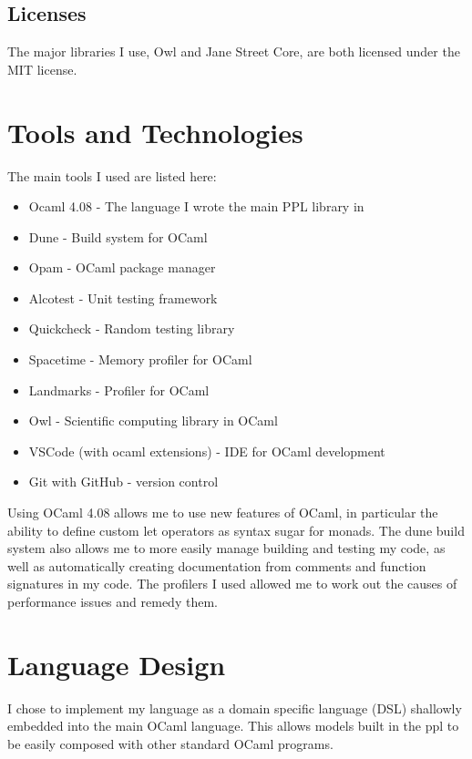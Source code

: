 \subsection{Licenses}

The major libraries I use, Owl and Jane Street Core, are both licensed under the MIT license.

\section{Tools and Technologies}
The main tools I used are listed here:
\begin{itemize}
    \item Ocaml 4.08 - The language I wrote the main PPL library in
    \item Dune - Build system for OCaml
    \item Opam - OCaml package manager
    \item Alcotest - Unit testing framework
    \item Quickcheck - Random testing library
    \item Spacetime - Memory profiler for OCaml
    \item Landmarks - Profiler for OCaml
    \item Owl - Scientific computing library in OCaml
    \item VSCode (with ocaml extensions) - IDE for OCaml development
    \item Git with GitHub - version control
\end{itemize}

Using OCaml 4.08 allows me to use new features of OCaml, in particular the ability to define custom let operators as syntax sugar for monads. The dune build system also allows me to more easily manage building and testing my code, as well as automatically creating documentation from comments and function signatures in my code. The profilers I used allowed me to work out the causes of performance issues and remedy them. 

\section{Language Design}
I chose to implement my language as a domain specific language (DSL) shallowly embedded into the main OCaml language. This allows models built in the ppl to be easily composed with other standard OCaml programs.

